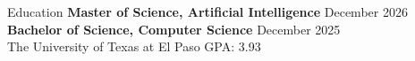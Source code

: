 \documentclass{resume} %
\begin{document}
\introduction[
    fullname=Ashkan Arabi,
    phone=(915) 888 - 9801,
    email=aarabimian@miners.utep.edu,
    linkedin=/in/ashkan-arabi,
    github=github.com/AshkanArabim,
]


\begin{workSection}{Education}
	\textbf{Master of Science, Artificial Intelligence} \hfill {December 2026} \\
	\textbf{Bachelor of Science, Computer Science} \hfill {December 2025} \\
	The University of Texas at El Paso \hfill GPA: 3.93
\end{workSection}

\end{document}
